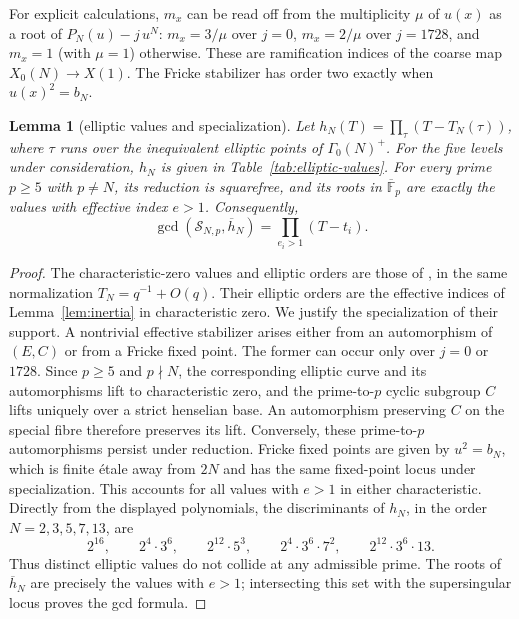 \documentclass[11pt,a4paper]{article}
\numberwithin{equation}{section}
\newtheorem{lemma}[theorem]{Lemma}
\theoremstyle{definition}
\theoremstyle{remark}
\newcommand{\Fb}{\overline{\mathbb F}_p}
\begin{document}
For explicit calculations, $m_x$ can be read off from the multiplicity $\mu$ of $u(x)$ as a root of
$P_N(u)-j\,u^N$: $m_x=3/\mu$ over $j=0$, $m_x=2/\mu$ over $j=1728$, and $m_x=1$ (with $\mu=1$) otherwise.
These are ramification indices of the coarse map $X_0(N)\to X(1)$.
The Fricke stabilizer has order two exactly when $u(x)^2=b_N$.

\begin{lemma}[elliptic values and specialization]\label{lem:elliptic-specialization}
Let $h_N(T)=\prod_{\tau}(T-T_N(\tau))$, where $\tau$ runs over the
inequivalent elliptic points of $\Gamma_0(N)^+$. For the five levels under
consideration, $h_N$ is given in Table~\ref{tab:elliptic-values}.
For every prime $p\ge5$ with $p\ne N$, its reduction is squarefree, and
its roots in $\Fb$ are exactly the values with effective index $e>1$.
Consequently,
\[
\gcd(\mathcal S_{N,p},\overline h_N)=\prod_{e_i>1}(T-t_i).
\]
\end{lemma}
\begin{proof}
The characteristic-zero values and elliptic orders are those of
\citet[\S4.2, Table~1 and Appendix~C]{JST19}, in the same normalization
$T_N=q^{-1}+O(q)$. Their elliptic orders are the effective indices of
Lemma~\ref{lem:inertia} in characteristic zero.
We justify the specialization of their support. A nontrivial effective
stabilizer arises either from an automorphism of $(E,C)$ or from a Fricke
fixed point. The former can occur only over $j=0$ or $1728$. Since
$p\ge5$ and $p\nmid N$, the corresponding elliptic curve and its
automorphisms lift to characteristic zero, and the prime-to-$p$ cyclic
subgroup $C$ lifts uniquely over a strict henselian base. An automorphism
preserving $C$ on the special fibre therefore preserves its lift.
Conversely, these prime-to-$p$ automorphisms persist under reduction.
Fricke fixed points are given by $u^2=b_N$, which is finite \'etale away
from $2N$ and has the same fixed-point locus under specialization.
This accounts for all values with $e>1$ in either characteristic.
Directly from the displayed polynomials, the discriminants of $h_N$, in
the order $N=2,3,5,7,13$, are
\[
2^{16},\qquad 2^4\cdot3^6,\qquad 2^{12}\cdot5^3,\qquad
2^4\cdot3^6\cdot7^2,\qquad 2^{12}\cdot3^6\cdot13.
\]
Thus distinct elliptic values do not collide at any admissible prime.
The roots of $\overline h_N$ are precisely the values with $e>1$;
intersecting this set with the supersingular locus proves the gcd formula.
\end{proof}
\end{document}
